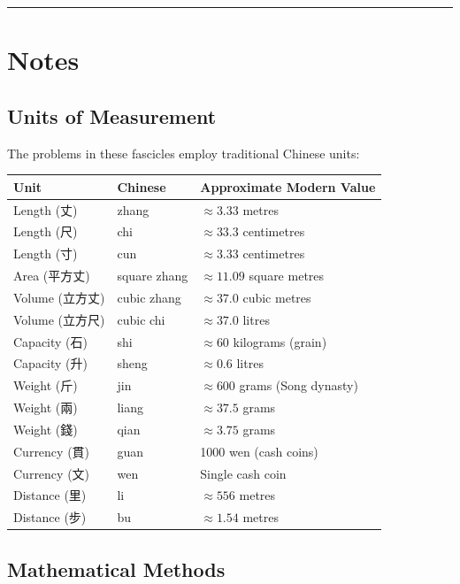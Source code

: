 \documentclass[11pt,a4paper]{article}
\newcommand{\longline}{\noindent\rule{\textwidth}{0.4pt}}
\begin{document}
\vspace{0.5em}
\longline

\newpage
\section*{Notes}

\subsection*{Units of Measurement}

The problems in these fascicles employ traditional Chinese units:

\begin{longtable}{lll}
\toprule
\textbf{Unit} & \textbf{Chinese} & \textbf{Approximate Modern Value} \\
\midrule
\endfirsthead
Length (丈) & zhang & $\approx 3.33$ metres \\
Length (尺) & chi & $\approx 33.3$ centimetres \\
Length (寸) & cun & $\approx 3.33$ centimetres \\
Area (平方丈) & square zhang & $\approx 11.09$ square metres \\
Volume (立方丈) & cubic zhang & $\approx 37.0$ cubic metres \\
Volume (立方尺) & cubic chi & $\approx 37.0$ litres \\
Capacity (石) & shi & $\approx 60$ kilograms (grain) \\
Capacity (升) & sheng & $\approx 0.6$ litres \\
Weight (斤) & jin & $\approx 600$ grams (Song dynasty) \\
Weight (兩) & liang & $\approx 37.5$ grams \\
Weight (錢) & qian & $\approx 3.75$ grams \\
Currency (貫) & guan & 1000 wen (cash coins) \\
Currency (文) & wen & Single cash coin \\
Distance (里) & li & $\approx 556$ metres \\
Distance (步) & bu & $\approx 1.54$ metres \\
\bottomrule
\end{longtable}

\subsection*{Mathematical Methods}
\end{document}
